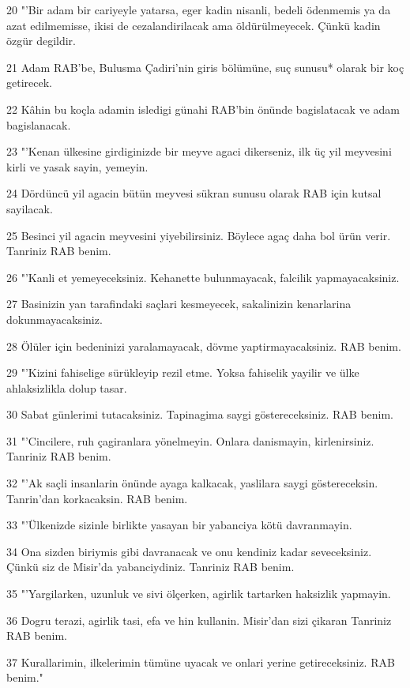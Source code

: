 \par 20 "'Bir adam bir cariyeyle yatarsa, eger kadin nisanli, bedeli ödenmemis ya da azat edilmemisse, ikisi de cezalandirilacak ama öldürülmeyecek. Çünkü kadin özgür degildir.
\par 21 Adam RAB'be, Bulusma Çadiri'nin giris bölümüne, suç sunusu* olarak bir koç getirecek.
\par 22 Kâhin bu koçla adamin isledigi günahi RAB'bin önünde bagislatacak ve adam bagislanacak.
\par 23 "'Kenan ülkesine girdiginizde bir meyve agaci dikerseniz, ilk üç yil meyvesini kirli ve yasak sayin, yemeyin.
\par 24 Dördüncü yil agacin bütün meyvesi sükran sunusu olarak RAB için kutsal sayilacak.
\par 25 Besinci yil agacin meyvesini yiyebilirsiniz. Böylece agaç daha bol ürün verir. Tanriniz RAB benim.
\par 26 "'Kanli et yemeyeceksiniz. Kehanette bulunmayacak, falcilik yapmayacaksiniz.
\par 27 Basinizin yan tarafindaki saçlari kesmeyecek, sakalinizin kenarlarina dokunmayacaksiniz.
\par 28 Ölüler için bedeninizi yaralamayacak, dövme yaptirmayacaksiniz. RAB benim.
\par 29 "'Kizini fahiselige sürükleyip rezil etme. Yoksa fahiselik yayilir ve ülke ahlaksizlikla dolup tasar.
\par 30 Sabat günlerimi tutacaksiniz. Tapinagima saygi göstereceksiniz. RAB benim.
\par 31 "'Cincilere, ruh çagiranlara yönelmeyin. Onlara danismayin, kirlenirsiniz. Tanriniz RAB benim.
\par 32 "'Ak saçli insanlarin önünde ayaga kalkacak, yaslilara saygi göstereceksin. Tanrin'dan korkacaksin. RAB benim.
\par 33 "'Ülkenizde sizinle birlikte yasayan bir yabanciya kötü davranmayin.
\par 34 Ona sizden biriymis gibi davranacak ve onu kendiniz kadar seveceksiniz. Çünkü siz de Misir'da yabanciydiniz. Tanriniz RAB benim.
\par 35 "'Yargilarken, uzunluk ve sivi ölçerken, agirlik tartarken haksizlik yapmayin.
\par 36 Dogru terazi, agirlik tasi, efa ve hin kullanin. Misir'dan sizi çikaran Tanriniz RAB benim.
\par 37 Kurallarimin, ilkelerimin tümüne uyacak ve onlari yerine getireceksiniz. RAB benim."

